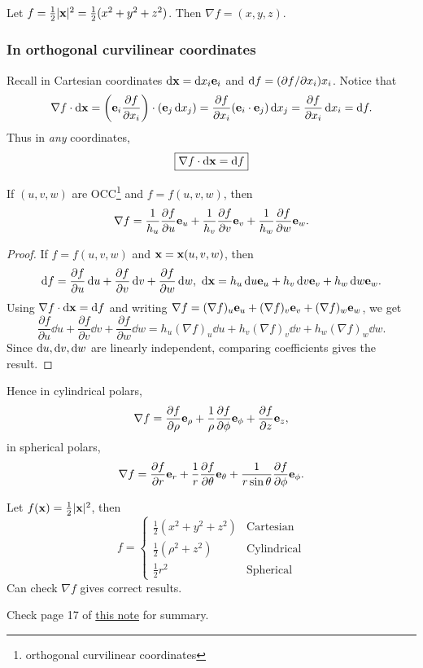 \begin{example}
    Let $ f=\frac{1}{2}|{\bf x}|^2 = \frac{1}{2}(x^2+y^2+z^2) $. Then $ \nabla f = (x,y,z) $.
\end{example}

\subsubsection{In orthogonal curvilinear coordinates}
Recall in Cartesian coordinates $ \mathrm{d} {\bf x} = \mathrm{d} x_i {\bf e}_i $ and $ \mathrm{d} f = (\partial f/\partial x_i ) x_i $. Notice that
\[
    \nabla f \cdot \mathrm{d} {\bf x} = \left( {\bf e}_i \frac{\partial f}{\partial x_i}  \right) \cdot \left( {\bf e}_j \,\mathrm{d} x_j \right) = \frac{\partial f}{\partial x_i}({\bf e}_i\cdot {\bf e}_j) \,\mathrm{d} x_j = \frac{\partial f}{\partial x_i}\,\mathrm{d} x_i = \mathrm{d} f.  
\]
Thus in \textit{any} coordinates, 
\[
    \boxed{\nabla f\cdot \mathrm{d} {\bf x} = \mathrm{d} f}
\] 

\begin{proposition}\label{prop:2.1}
    If $ (u,v,w) $ are OCC\footnote{orthogonal curvilinear coordinates} and $f=f(u,v,w)$, then 
    \[
        \nabla f = \frac{1}{h_u}\frac{\partial f}{\partial u}{\bf e}_u + \frac{1}{h_v}\frac{\partial f}{\partial v}{\bf e}_v + \frac{1}{h_w}\frac{\partial f}{\partial w}{\bf e}_w.
    \] 
\end{proposition}
\begin{proof}
    If $ f=f(u,v,w) $ and $ {\bf x} = {\bf x}(u,v,w) $, then 
    \[
        \mathrm{d} f = \frac{\partial f}{\partial u}\,\mathrm{d} u +\frac{\partial f}{\partial v}\,\mathrm{d} v +\frac{\partial f}{\partial w}\,\mathrm{d} w,\ \mathrm{d} {\bf x} = h_u\,\mathrm{d} u{\bf e}_u+h_v\,\mathrm{d} v{\bf e}_v+h_w\,\mathrm{d} w{\bf e}_w.
    \]
    Using $\nabla f\cdot \mathrm{d} {\bf x} = \mathrm{d} f$ and writing $ \nabla f = (\nabla f)_u{\bf e}_u+(\nabla f)_v{\bf e}_v+(\nabla f)_w{\bf e}_w $, we get 
    \[
        \frac{\partial f}{\partial u}\dd u +\frac{\partial f}{\partial v}\dd v +\frac{\partial f}{\partial w}\dd w = h_u(\nabla f)_u \dd u+h_v(\nabla f)_v \dd v+h_w(\nabla f)_w \dd w.
    \]
    Since $ \mathrm{d} u, \mathrm{d} v,\mathrm{d} w $ are linearly independent, comparing coefficients gives the result.
\end{proof}

Hence in cylindrical polars,
\[
    \nabla f = \frac{\partial f}{\partial \rho}{\bf e}_\rho+\frac{1}{\rho} \frac{\partial f}{\partial \phi}{\bf e}_\phi+\frac{\partial f}{\partial z}{\bf e}_z,  
\]
in spherical polars,
\[
    \nabla f = \frac{\partial f}{\partial r}{\bf e}_r+\frac{1}{r}\frac{\partial f}{\partial \theta}{\bf e}_\theta+\frac{1}{r\sin\theta}\frac{\partial f}{\partial \phi}{\bf e}_\phi.   
\]
\begin{example}
    Let $ f({\bf x})= \frac{1}{2}|{\bf x}|^2 $, then 
    \[
        f = \begin{cases}
        \frac{1}{2}(x^2+y^2+z^2) &\text{Cartesian}\\
        \frac{1}{2}(\rho^2+z^2) &\text{Cylindrical}\\
        \frac{1}{2}r^2 &\text{Spherical}
        \end{cases} 
    \]
    Can check $ \nabla f $ gives correct results.
\end{example}
Check page 17 of \href{https://www.vle.cam.ac.uk/pluginfile.php/19798882/mod_resource/content/2/vc_notes1.pdf}{this note} for summary.
